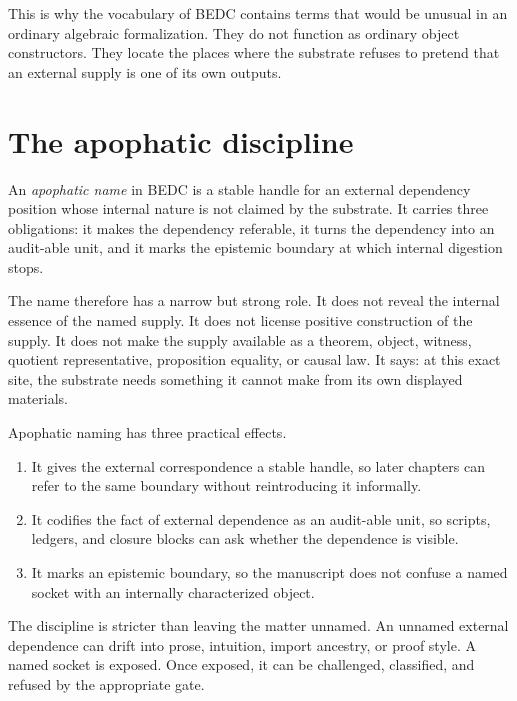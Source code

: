 This is why the vocabulary of BEDC contains terms that would be unusual in an ordinary algebraic formalization. They do not function as ordinary object constructors. They locate the places where the substrate refuses to pretend that an external supply is one of its own outputs.

\section{The apophatic discipline}
\label{sec:apophatic-naming-discipline}

\begin{definition}
\label{def:apophatic-name}
An \emph{apophatic name} in BEDC is a stable handle for an external dependency position whose internal nature is not claimed by the substrate. It carries three obligations: it makes the dependency referable, it turns the dependency into an audit-able unit, and it marks the epistemic boundary at which internal digestion stops.
\end{definition}

The name therefore has a narrow but strong role. It does not reveal the internal essence of the named supply. It does not license positive construction of the supply. It does not make the supply available as a theorem, object, witness, quotient representative, proposition equality, or causal law. It says: at this exact site, the substrate needs something it cannot make from its own displayed materials.

Apophatic naming has three practical effects.

\begin{enumerate}
\item It gives the external correspondence a stable handle, so later chapters can refer to the same boundary without reintroducing it informally.
\item It codifies the fact of external dependence as an audit-able unit, so scripts, ledgers, and closure blocks can ask whether the dependence is visible.
\item It marks an epistemic boundary, so the manuscript does not confuse a named socket with an internally characterized object.
\end{enumerate}

The discipline is stricter than leaving the matter unnamed. An unnamed external dependence can drift into prose, intuition, import ancestry, or proof style. A named socket is exposed. Once exposed, it can be challenged, classified, and refused by the appropriate gate.


